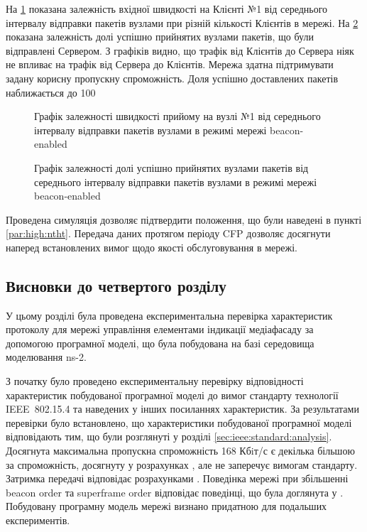 \documentclass[a4paper,ukrainian,utf8,nocolumnsxix,floatsection,equationsection]{eskdtext}
\newcommand{\longcaption}[1]{\captionsetup{style=figureLongCaption}\caption{#1}}
\newcommand{\iee}[0]{IEEE~802.15.4\xspace}
\newcommand{\bem}[0]{beacon-enabled\xspace}
\begin{document}
На \cref{fig:result_test_backtraf_beac_brd_tp1} показана залежність вхідної швидкості на Клієнті №1 від середнього інтервалу відправки пакетів вузлами при різній кількості Клієнтів в мережі. На \cref{fig:result_test_backtraf_beac_brd_deliv} показана залежність долі успішно прийнятих вузлами пакетів, що були відправлені Сервером. З графіків видно, що трафік від Клієнтів до Сервера ніяк не впливає на трафік від Сервера до Клієнтів. Мережа здатна підтримувати задану корисну пропускну спроможність. Доля успішно доставлених пакетів наближається до 100%

\begin{figure}[bp]
	\centering
	\longcaption{\label{fig:result_test_backtraf_beac_brd_tp1}Графік залежності швидкості прийому на вузлі №1 від середнього інтервалу відправки пакетів вузлами в режимі мережі \bem}
\end{figure}

\begin{figure}[htbp]
	\centering
	\longcaption{\label{fig:result_test_backtraf_beac_brd_deliv}Графік залежності долі успішно прийнятих вузлами пакетів від середнього інтервалу відправки пакетів вузлами в режимі мережі \bem}
\end{figure}


Проведена симуляція дозволяє підтвердити положення, що були наведені в пункті \ref{par:high:ntht}. Передача даних протягом періоду CFP дозволяє досягнути наперед встановлених вимог щодо якості обслуговування в мережі. 

\subsection{Висновки до  четвертого розділу}

У цьому розділі була проведена експериментальна перевірка характеристик протоколу для мережі управління елементами індикації медіафасаду за допомогою програмної моделі, що була побудована на базі середовища моделювання ns-2.

З початку було проведено експериментальну перевірку відповідності характеристик побудованої програмної моделі до вимог стандарту технології \iee та наведених у інших посиланнях характеристик. За результатами перевірки було встановлено, що характеристики побудованої програмної моделі відповідають тим, що були розглянуті у розділі \ref{sec:ieee:standard:analysis}. Досягнута максимальна пропускна спроможність  168 Кбiт/с є декілька більшою за спроможність, досягнуту у розрахунках \cite{thoroughput:analysis:unslotted:ieee}, але не заперечує вимогам стандарту. Затримка передачі відповідає розрахунками \cite{thoroughput:analysis:unslotted:ieee}. Поведінка мережі при збільшенні beacon order та superframe order відповідає поведінці, що була доглянута у \cite{simulation:study:slotted:ieee}. Побудовану програмну модель мережі визнано придатною для подальших експериментів.
\end{document}
